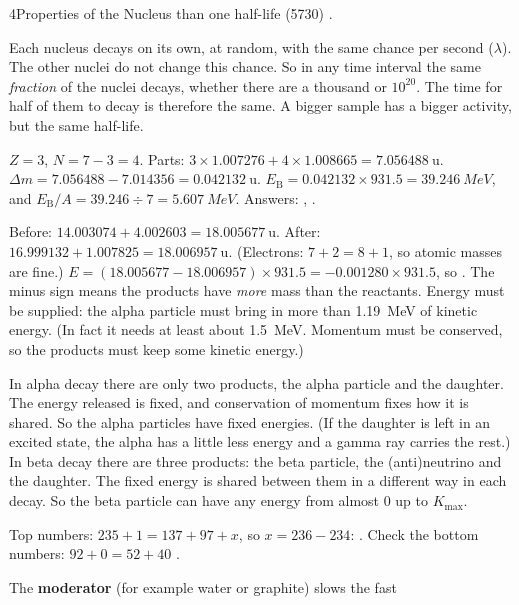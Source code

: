 \begin{chapteranswers}{4}{Properties of the Nucleus}
        than one half-life (\qty{5730}{\yr}) \cmark.
  \item Each nucleus decays on its own, at random, with the same chance per second
        ($\lambda$). The other nuclei do not change this chance. So in any time
        interval the same \emph{fraction} of the nuclei decays, whether there are a
        thousand or $10^{20}$. The time for half of them to decay is therefore the same.
        A bigger sample has a bigger activity, but the same half-life.
  \item $Z = 3$, $N = 7 - 3 = 4$. Parts:
        $3 \times 1.007276 + 4 \times 1.008665 = \qty{7.056488}{\amu}$.
        $\Delta m = 7.056488 - 7.014356 = \qty{0.042132}{\amu}$.
        $E_\mathrm{B} = 0.042132 \times 931.5 = \qty{39.246}{MeV}$, and
        $E_\mathrm{B}/A = 39.246 \div 7 = \qty{5.607}{MeV}$.
        Answers: ,
        .
  \item Before: $14.003074 + 4.002603 = \qty{18.005677}{\amu}$. After:
        $16.999132 + 1.007825 = \qty{18.006957}{\amu}$. (Electrons: $7 + 2 = 8 + 1$, so
        atomic masses are fine.)
        $E = (18.005677 - 18.006957) \times 931.5 = -0.001280 \times 931.5$, so
        . The minus sign means the products have
        \emph{more} mass than the reactants. Energy must be supplied: the alpha
        particle must bring in more than \qty{1.19}{MeV} of kinetic energy. (In fact
        it needs at least about \qty{1.5}{MeV}. Momentum must be conserved, so the
        products must keep some kinetic energy.)
  \item In alpha decay there are only two products, the alpha particle and the
        daughter. The energy released is fixed, and conservation of momentum fixes how
        it is shared. So the alpha particles have fixed energies. (If the daughter is
        left in an excited state, the alpha has a little less energy and a gamma ray
        carries the rest.) In beta decay
        there are three products: the beta particle, the (anti)neutrino and the
        daughter. The fixed energy is shared between them in a different way in each
        decay. So the beta particle can have any energy from almost 0 up to
        $K_\mathrm{max}$.
  \item Top numbers: $235 + 1 = 137 + 97 + x$, so $x = 236 - 234$:
        . Check the bottom numbers: $92 + 0 = 52 + 40$ \cmark.
  \item The \textbf{moderator} (for example water or graphite) slows the fast

\end{chapteranswers}
